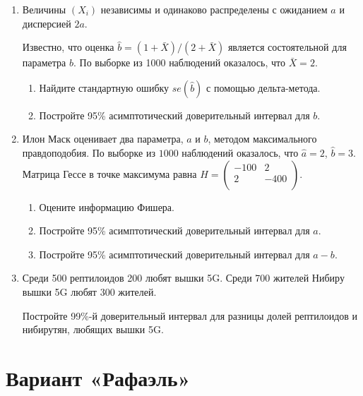 \documentclass[12pt]{article}
\begin{document}
\begin{enumerate}
\item Величины $(X_i)$ независимы и одинаково распределены с ожиданием $a$ и дисперсией $2a$.

Известно, что оценка $\hat b = (1 + \bar X)/(2 + \bar X)$ является состоятельной для параметра $b$. 
По выборке из 1000 наблюдений оказалось, что $\bar X = 2$.

\begin{enumerate}
    \item Найдите стандартную ошибку $se(\hat b)$ с помощью дельта-метода.
    \item Постройте 95\% асимптотический доверительный интервал для $b$.
\end{enumerate}

\item Илон Маск оценивает два параметра, $a$ и $b$, методом максимального правдоподобия. 
По выборке из $1000$ наблюдений оказалось, что $\hat a = 2$, $\hat b = 3$.
Матрица Гессе в точке максимума равна $H = \begin{pmatrix}
    -100 & 2 \\
    2 & -400 \\
\end{pmatrix}$.
\begin{enumerate}
    \item Оцените информацию Фишера. 
    \item Постройте 95\% асимптотический доверительный интервал для $a$.
    \item Постройте 95\% асимптотический доверительный интервал для $a - b$.
\end{enumerate}

\item Среди 500 рептилоидов 200 любят вышки 5G. 
Среди 700 жителей Нибиру вышки 5G любят 300 жителей. 

Постройте 99\%-й доверительный интервал для разницы долей рептилоидов и нибирутян, любящих вышки 5G.


\end{enumerate}


\section*{Вариант «Рафаэль»}
\end{document}
